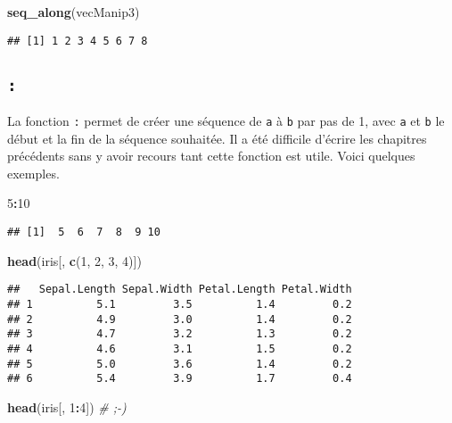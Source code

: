 \documentclass[]{book}
\newenvironment{Shaded}{\begin{snugshade}}{\end{snugshade}}
\newcommand{\KeywordTok}[1]{\textcolor[rgb]{0.13,0.29,0.53}{\textbf{#1}}}
\newcommand{\DecValTok}[1]{\textcolor[rgb]{0.00,0.00,0.81}{#1}}
\newcommand{\CommentTok}[1]{\textcolor[rgb]{0.56,0.35,0.01}{\textit{#1}}}
\newcommand{\OperatorTok}[1]{\textcolor[rgb]{0.81,0.36,0.00}{\textbf{#1}}}
\newcommand{\NormalTok}[1]{#1}
\theoremstyle{definition}
\theoremstyle{definition}
\theoremstyle{definition}
\theoremstyle{remark}
\begin{document}
\begin{Shaded}
\begin{Highlighting}[]
\KeywordTok{seq_along}\NormalTok{(vecManip3)}
\end{Highlighting}
\end{Shaded}

\begin{verbatim}
## [1] 1 2 3 4 5 6 7 8
\end{verbatim}

\hypertarget{l0152points}{\subsection{\texorpdfstring{\texttt{:}}{:}}\label{l0152points}}

La fonction \texttt{:} permet de créer une séquence de \texttt{a} à
\texttt{b} par pas de 1, avec \texttt{a} et \texttt{b} le début et la
fin de la séquence souhaitée. Il a été difficile d'écrire les chapitres
précédents sans y avoir recours tant cette fonction est utile. Voici
quelques exemples.

\begin{Shaded}
\begin{Highlighting}[]
\DecValTok{5}\OperatorTok{:}\DecValTok{10}
\end{Highlighting}
\end{Shaded}

\begin{verbatim}
## [1]  5  6  7  8  9 10
\end{verbatim}

\begin{Shaded}
\begin{Highlighting}[]
\KeywordTok{head}\NormalTok{(iris[, }\KeywordTok{c}\NormalTok{(}\DecValTok{1}\NormalTok{, }\DecValTok{2}\NormalTok{, }\DecValTok{3}\NormalTok{, }\DecValTok{4}\NormalTok{)])}
\end{Highlighting}
\end{Shaded}

\begin{verbatim}
##   Sepal.Length Sepal.Width Petal.Length Petal.Width
## 1          5.1         3.5          1.4         0.2
## 2          4.9         3.0          1.4         0.2
## 3          4.7         3.2          1.3         0.2
## 4          4.6         3.1          1.5         0.2
## 5          5.0         3.6          1.4         0.2
## 6          5.4         3.9          1.7         0.4
\end{verbatim}

\begin{Shaded}
\begin{Highlighting}[]
\KeywordTok{head}\NormalTok{(iris[, }\DecValTok{1}\OperatorTok{:}\DecValTok{4}\NormalTok{]) }\CommentTok{# ;-)}
\end{Highlighting}
\end{Shaded}
\end{document}
